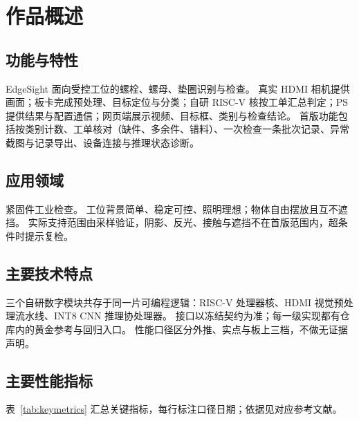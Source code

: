\section{作品概述}
\label{sec:overview}

\subsection{功能与特性}
EdgeSight 面向受控工位的螺栓、螺母、垫圈识别与检查。
真实 HDMI 相机提供画面；板卡完成预处理、目标定位与分类；自研 RISC-V 核按工单汇总判定；PS 提供结果与配置通信；网页端展示视频、目标框、类别与检查结论。
首版功能包括按类别计数、工单核对（缺件、多余件、错料）、一次检查一条批次记录、异常截图与记录导出、设备连接与推理状态诊断。

\subsection{应用领域}
紧固件工业检查。
工位背景简单、稳定可控、照明理想；物体自由摆放且互不遮挡。
实际支持范围由采样验证，阴影、反光、接触与遮挡不在首版范围内，超条件时提示复检。

\subsection{主要技术特点}
三个自研数字模块共存于同一片可编程逻辑：RISC-V 处理器核、HDMI 视觉预处理流水线、INT8 CNN 推理协处理器。
接口以冻结契约为准；每一级实现都有仓库内的黄金参考与回归入口。
性能口径区分外推、实点与板上三档，不做无证据声明。

\subsection{主要性能指标}
表~\ref{tab:keymetrics} 汇总关键指标，每行标注口径日期；依据见对应参考文献。

